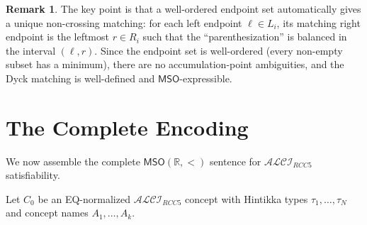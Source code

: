 \documentclass[a4paper,11pt]{article}
\theoremstyle{definition}
\newtheorem{remark}[theorem]{Remark}
\newcommand{\ALCIRCC}[1]{\ensuremath{\mathcal{ALCI}_{\mathit{RCC#1}}}}
\newcommand{\MSO}{\ensuremath{\mathsf{MSO}}}
\newcommand{\reals}{\ensuremath{\mathbb{R}}}
\begin{document}
\begin{remark}
The key point is that a well-ordered endpoint set automatically gives
a unique non-crossing matching: for each left endpoint $\ell \in L_i$,
its matching right endpoint is the leftmost $r \in R_i$ such that the
``parenthesization'' is balanced in the interval $(\ell, r)$.  Since
the endpoint set is well-ordered (every non-empty subset has a
minimum), there are no accumulation-point ambiguities, and the Dyck
matching is well-defined and $\MSO$-expressible.
\end{remark}

\section{The Complete Encoding}
\label{sec:complete}

We now assemble the complete $\MSO(\reals, <)$ sentence for
$\ALCIRCC{5}$ satisfiability.

Let $C_0$ be an EQ-normalized $\ALCIRCC{5}$ concept with
Hintikka types $\tau_1, \ldots, \tau_N$ and concept names
$A_1, \ldots, A_k$.
\end{document}
